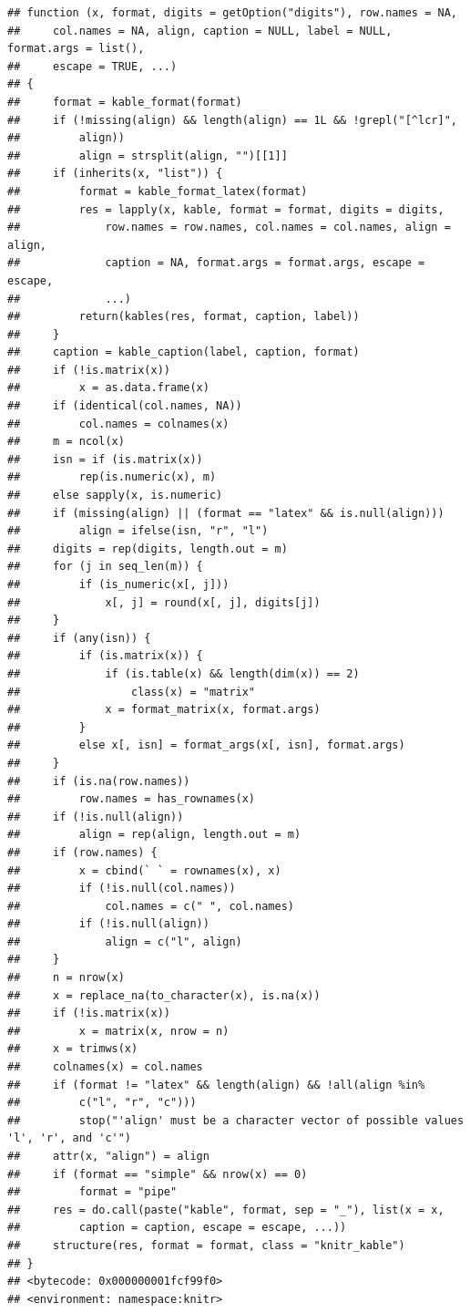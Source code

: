 \documentclass[
]{article}
\begin{document}
\begin{verbatim}
## function (x, format, digits = getOption("digits"), row.names = NA, 
##     col.names = NA, align, caption = NULL, label = NULL, format.args = list(), 
##     escape = TRUE, ...) 
## {
##     format = kable_format(format)
##     if (!missing(align) && length(align) == 1L && !grepl("[^lcr]", 
##         align)) 
##         align = strsplit(align, "")[[1]]
##     if (inherits(x, "list")) {
##         format = kable_format_latex(format)
##         res = lapply(x, kable, format = format, digits = digits, 
##             row.names = row.names, col.names = col.names, align = align, 
##             caption = NA, format.args = format.args, escape = escape, 
##             ...)
##         return(kables(res, format, caption, label))
##     }
##     caption = kable_caption(label, caption, format)
##     if (!is.matrix(x)) 
##         x = as.data.frame(x)
##     if (identical(col.names, NA)) 
##         col.names = colnames(x)
##     m = ncol(x)
##     isn = if (is.matrix(x)) 
##         rep(is.numeric(x), m)
##     else sapply(x, is.numeric)
##     if (missing(align) || (format == "latex" && is.null(align))) 
##         align = ifelse(isn, "r", "l")
##     digits = rep(digits, length.out = m)
##     for (j in seq_len(m)) {
##         if (is_numeric(x[, j])) 
##             x[, j] = round(x[, j], digits[j])
##     }
##     if (any(isn)) {
##         if (is.matrix(x)) {
##             if (is.table(x) && length(dim(x)) == 2) 
##                 class(x) = "matrix"
##             x = format_matrix(x, format.args)
##         }
##         else x[, isn] = format_args(x[, isn], format.args)
##     }
##     if (is.na(row.names)) 
##         row.names = has_rownames(x)
##     if (!is.null(align)) 
##         align = rep(align, length.out = m)
##     if (row.names) {
##         x = cbind(` ` = rownames(x), x)
##         if (!is.null(col.names)) 
##             col.names = c(" ", col.names)
##         if (!is.null(align)) 
##             align = c("l", align)
##     }
##     n = nrow(x)
##     x = replace_na(to_character(x), is.na(x))
##     if (!is.matrix(x)) 
##         x = matrix(x, nrow = n)
##     x = trimws(x)
##     colnames(x) = col.names
##     if (format != "latex" && length(align) && !all(align %in% 
##         c("l", "r", "c"))) 
##         stop("'align' must be a character vector of possible values 'l', 'r', and 'c'")
##     attr(x, "align") = align
##     if (format == "simple" && nrow(x) == 0) 
##         format = "pipe"
##     res = do.call(paste("kable", format, sep = "_"), list(x = x, 
##         caption = caption, escape = escape, ...))
##     structure(res, format = format, class = "knitr_kable")
## }
## <bytecode: 0x000000001fcf99f0>
## <environment: namespace:knitr>
\end{verbatim}
\end{document}
